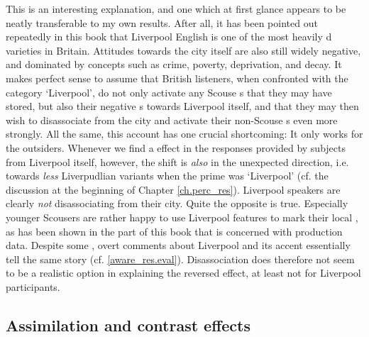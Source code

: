 This is an interesting explanation, and one which at first glance appears to be neatly transferable to my own results.
After all, it has been pointed out repeatedly in this book that Liverpool English is one of the most heavily d varieties in Britain.
Attitudes towards the city itself are also still widely negative, and dominated by concepts such as crime, poverty, deprivation, and decay.
It makes perfect sense to assume that British listeners, when confronted with the category `Liverpool', do not only activate any Scouse s that they may have stored, but also their negative s towards Liverpool itself, and that they may then wish to disassociate from the city and activate their non-Scouse s even more strongly.
All the same, this account has one crucial shortcoming: It only works for the outsiders.
Whenever we find a  effect in the responses provided by subjects from Liverpool itself, however, the shift is \emph{also} in the unexpected direction, i.e. towards \emph{less} Liverpudlian variants when the prime was `Liverpool' (cf. the discussion at the beginning of Chapter \ref{ch.perc_res}).
Liverpool speakers are clearly \emph{not} disassociating from their city.
Quite the opposite is true.
Especially younger Scousers are rather happy to use Liverpool features to mark their local , as has been shown in the part of this book that is concerned with production data.
Despite some , overt comments about Liverpool and its accent essentially tell the same story (cf. \ref{aware_res.eval}).
Disassociation does therefore not seem to be a realistic option in explaining the reversed  effect, at least not for Liverpool participants.

		\subsection{Assimilation and contrast effects}

